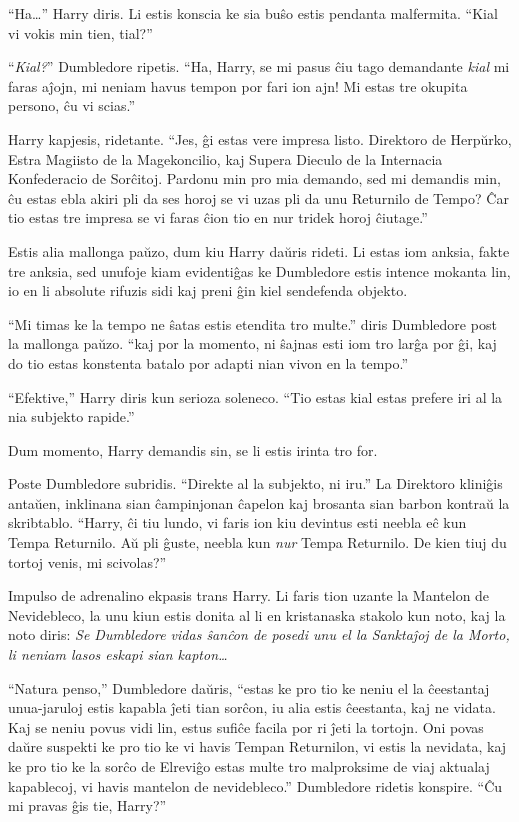 ``Ha\ldots'' Harry diris. Li estis konscia ke sia buŝo estis pendanta
malfermita. ``Kial vi vokis min tien, tial?''

``\emph{Kial?}'' Dumbledore ripetis. ``Ha, Harry, se mi pasus ĉiu tago
demandante \emph{kial} mi faras aĵojn, mi neniam havus tempon por fari
ion ajn! Mi estas tre okupita persono, ĉu vi scias.''

Harry kapjesis, ridetante. ``Jes, ĝi estas vere impresa
listo. Direktoro de Herpŭrko, Estra Magiisto de la Magekoncilio, kaj
Supera Dieculo de la Internacia Konfederacio de Sorĉitoj. Pardonu min
pro mia demando, sed mi demandis min, ĉu estas ebla akiri pli da ses
horoj se vi uzas pli da unu Returnilo de Tempo? Ĉar tio estas tre
impresa se vi faras ĉion tio en nur tridek horoj ĉiutage.''

Estis alia mallonga paŭzo, dum kiu Harry daŭris rideti. Li estas iom
anksia, fakte tre anksia, sed unufoje kiam evidentiĝas ke Dumbledore
estis intence mokanta lin, io en li absolute rifuzis sidi kaj preni
ĝin kiel sendefenda objekto.

``Mi timas ke la tempo ne ŝatas estis etendita tro multe.'' diris
Dumbledore post la mallonga paŭzo. ``kaj por la momento, ni ŝajnas
esti iom tro larĝa por ĝi, kaj do tio estas konstenta batalo por
adapti nian vivon en la tempo.''

``Efektive,'' Harry diris kun serioza soleneco. ``Tio estas kial estas
prefere iri al la nia subjekto rapide.''

Dum momento, Harry demandis sin, se li estis irinta tro for.

Poste Dumbledore subridis. ``Direkte al la subjekto, ni iru.'' La
Direktoro kliniĝis antaŭen, inklinana sian ĉampinjonan ĉapelon kaj
brosanta sian barbon kontraŭ la skribtablo. ``Harry, ĉi tiu lundo, vi
faris ion kiu devintus esti neebla eĉ kun Tempa Returnilo. Aŭ pli
ĝuste, neebla kun \emph{nur} Tempa Returnilo. De kien tiuj du tortoj
venis, mi scivolas?''

Impulso de adrenalino ekpasis trans Harry. Li faris tion uzante la
Mantelon de Nevidebleco, la unu kiun estis donita al li en kristanaska
stakolo kun noto, kaj la noto diris: \emph{Se Dumbledore vidas ŝanĉon
de posedi unu el la Sanktaĵoj de la Morto, li neniam lasos eskapi sian
kapton\ldots}

``Natura penso,'' Dumbledore daŭris, ``estas ke pro tio ke neniu el la
ĉeestantaj unua-jaruloj estis kapabla ĵeti tian sorĉon, iu alia estis
ĉeestanta, kaj ne vidata. Kaj se neniu povus vidi lin, estus sufiĉe
facila por ri ĵeti la tortojn. Oni povas daŭre suspekti ke pro tio ke
vi havis Tempan Returnilon, vi estis la nevidata, kaj ke pro tio ke la
sorĉo de Elreviĝo estas multe tro malproksime de viaj aktualaj
kapablecoj, vi havis mantelon de nevidebleco.'' Dumbledore ridetis
konspire. ``Ĉu mi pravas ĝis tie, Harry?''

